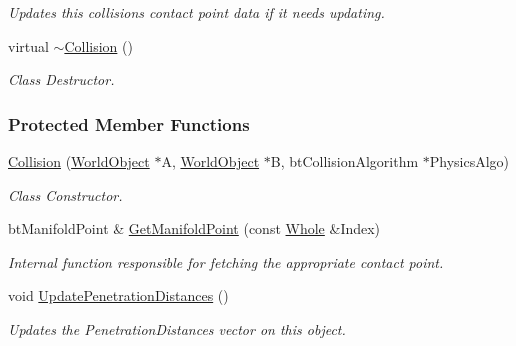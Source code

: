 \begin{DoxyCompactItemize}
\begin{DoxyCompactList}\small\item\em Updates this collisions contact point data if it needs updating. \item\end{DoxyCompactList}\item 
virtual \hyperlink{classMezzanine_1_1Collision_abeac6cfc637fe44493602a04f75c0232}{$\sim$Collision} ()
\begin{DoxyCompactList}\small\item\em Class Destructor. \item\end{DoxyCompactList}\end{DoxyCompactItemize}
\subsubsection*{Protected Member Functions}
\begin{DoxyCompactItemize}
\item 
\hyperlink{classMezzanine_1_1Collision_a2f367a05c29086e86395ca5f6f2c4728}{Collision} (\hyperlink{classMezzanine_1_1WorldObject}{WorldObject} $\ast$A, \hyperlink{classMezzanine_1_1WorldObject}{WorldObject} $\ast$B, btCollisionAlgorithm $\ast$PhysicsAlgo)
\begin{DoxyCompactList}\small\item\em Class Constructor. \item\end{DoxyCompactList}\item 
\hypertarget{classMezzanine_1_1Collision_ab337bbfb55f330ac095934cd1a0e40ed}{
btManifoldPoint \& \hyperlink{classMezzanine_1_1Collision_ab337bbfb55f330ac095934cd1a0e40ed}{GetManifoldPoint} (const \hyperlink{namespaceMezzanine_adcbb6ce6d1eb4379d109e51171e2e493}{Whole} \&Index)}
\label{classMezzanine_1_1Collision_ab337bbfb55f330ac095934cd1a0e40ed}

\begin{DoxyCompactList}\small\item\em Internal function responsible for fetching the appropriate contact point. \item\end{DoxyCompactList}\item 
\hypertarget{classMezzanine_1_1Collision_ac64ad25958ee82b8fdfd61888f2531f9}{
void \hyperlink{classMezzanine_1_1Collision_ac64ad25958ee82b8fdfd61888f2531f9}{UpdatePenetrationDistances} ()}
\label{classMezzanine_1_1Collision_ac64ad25958ee82b8fdfd61888f2531f9}

\begin{DoxyCompactList}\small\item\em Updates the PenetrationDistances vector on this object. \item\end{DoxyCompactList}\end{DoxyCompactItemize}

